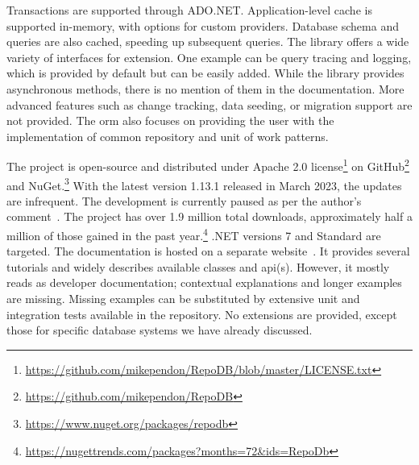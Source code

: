 Transactions are supported through ADO.NET. Application-level cache is supported in-memory, with options for custom providers. Database schema and queries are also cached, speeding up subsequent queries. The library offers a wide variety of interfaces for extension. One example can be query tracing and logging, which is provided by default but can be easily added. While the library provides asynchronous methods, there is no mention of them in the documentation. More advanced features such as change tracking, data seeding, or migration support are not provided. The \acrshort{orm} also focuses on providing the user with the implementation of common repository and unit of work patterns.

The project is open-source and distributed under Apache 2.0 license\footnote{\url{https://github.com/mikependon/RepoDB/blob/master/LICENSE.txt}} on GitHub\footnote{\url{https://github.com/mikependon/RepoDB}} and NuGet.\footnote{\url{https://www.nuget.org/packages/repodb}} With the latest version 1.13.1 released in March 2023, the updates are infrequent. The development is currently paused as per the author's comment~\cite{PendonRepoDBComment}. The project has over 1.9 million total downloads, approximately half a million of those gained in the past year.\footnote{\url{https://nugettrends.com/packages?months=72&ids=RepoDb}} .NET versions 7 and Standard are targeted. The documentation is hosted on a separate website~\cite{RepoDB}. It provides several tutorials and widely describes available classes and \acrshort{api}(s). However, it mostly reads as developer documentation; contextual explanations and longer examples are missing. Missing examples can be substituted by extensive unit and integration tests available in the repository. No extensions are provided, except those for specific database systems we have already discussed.


